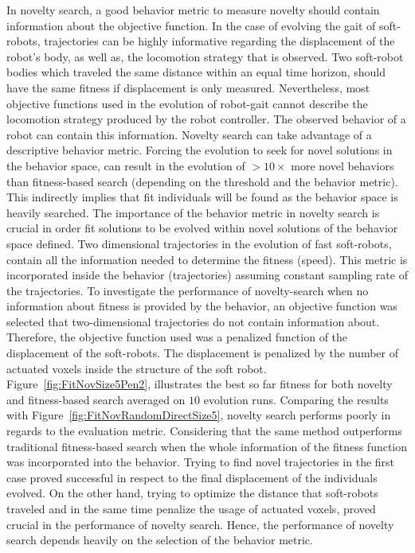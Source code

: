 In novelty search, a good behavior metric to measure novelty should contain information about the objective function. In the case of evolving the gait of soft-robots, trajectories can be highly informative regarding the displacement of the robot's body, as well as, the locomotion strategy that is observed. Two soft-robot bodies which traveled the same distance within an equal time horizon, should have the same fitness if displacement is only measured. Nevertheless, most objective functions used in the evolution of robot-gait cannot describe the locomotion strategy produced by the robot controller. The observed behavior of a robot can contain this information. Novelty search can take advantage of a descriptive behavior metric. Forcing the evolution to seek for  novel solutions in the behavior space, can result in the evolution of $>10 \times$ more novel behaviors than fitness-based search (depending on the threshold and the behavior metric). This indirectly implies that fit individuals will be found as the behavior space is heavily searched.
The importance of the behavior metric in novelty search is crucial in order fit solutions to be evolved within novel solutions of the behavior space defined. Two dimensional trajectories in the evolution of fast soft-robots, contain all the information needed to determine the fitness (speed). This metric is incorporated inside the behavior (trajectories) assuming constant sampling rate of the trajectories. To investigate the performance of novelty-search when no information about fitness is provided by the behavior, an objective function was selected that two-dimensional trajectories do not contain information about. Therefore, the objective function used was a penalized function of the displacement of the soft-robots. The displacement is penalized by the number of actuated voxels inside the structure of the soft robot. Figure~\ref{fig:FitNovSize5Pen2}, illustrates the best so far fitness for both novelty and fitness-based search averaged on $10$ evolution runs. Comparing the results with Figure~\ref{fig:FitNovRandomDirectSize5}, novelty search performs poorly in regards to the evaluation metric. Considering that the same method outperforms traditional fitness-based search when the whole information of the fitness function was incorporated into the behavior. Trying to find novel trajectories in the first case proved successful in respect to the final displacement of the individuals evolved. On the other hand, trying to optimize the distance that soft-robots traveled and in the same time penalize the usage of actuated voxels, proved crucial in the performance of novelty search. Hence, the performance of novelty search depends heavily on the selection of the behavior metric.


